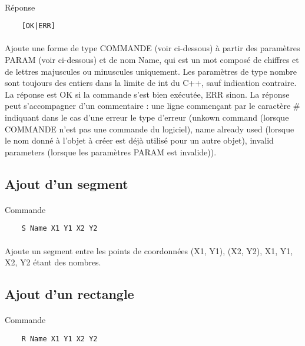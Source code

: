 \paragraph{}
Réponse
\begin{lstlisting}
	[OK|ERR]
\end{lstlisting}
\paragraph{}
Ajoute une forme de type COMMANDE (voir ci-dessous) à partir des paramètres PARAM (voir ci-dessous) et de nom Name, qui est un mot composé de chiffres et de lettres majuscules ou minuscules uniquement. Les paramètres de type nombre sont toujours des entiers dans la limite de int du C++, sauf indication contraire. La réponse est OK si la commande s'est bien exécutée, ERR sinon. La réponse peut s'accompagner d'un commentaire : une ligne commençant par le caractère \# indiquant dans le cas d'une erreur le type d'erreur (unkown command (lorsque COMMANDE n'est pas une commande du logiciel), name already used (lorsque le nom donné à l'objet à créer est déjà utilisé pour un autre objet), invalid parameters (lorsque les paramètres PARAM est invalide)).

\subsection{Ajout d'un segment}
 \paragraph{}
Commande
\begin{lstlisting}
	S Name X1 Y1 X2 Y2
\end{lstlisting}
\paragraph{}
Ajoute un segment entre les points de coordonnées (X1, Y1), (X2, Y2), X1, Y1, X2, Y2 étant des nombres.

\subsection{Ajout d'un rectangle}
 \paragraph{}
Commande
\begin{lstlisting}
	R Name X1 Y1 X2 Y2
\end{lstlisting}
